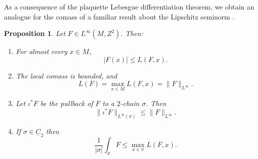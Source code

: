 \documentclass[reqno,11pt]{amsart}
\newcommand*\dif{\mathop{}\!\mathrm{d}}
\newcommand{\Chain}{\underline C}
\newtheorem{proposition}[theorem]{Proposition}
\theoremstyle{definition}
\numberwithin{equation}{section}
\begin{document}
As a consequence of the plaquette Lebesgue differentiation theorem, we obtain an analogue for the comass of a familiar result about the Lipschitz seminorm \cite[Lemma 4.3]{Crandall2008}.

\begin{proposition}\label{crandall}
Let $F \in L^\infty(M, Z^2)$. Then:
\begin{enumerate}
\item For almost every $x \in M$,
$$|F(x)| \leq L(F, x).$$
\label{crandall LDT}
\item The local comass is bounded, and \label{crandall linfinity}
$$L(F) = \max_{x \in M} L(F, x) = \|F\|_{L^\infty}.$$
\item Let $\iota^* F$ be the pullback of $F$ to a $2$-chain $\sigma$. Then
$$\|\iota^* F\|_{L^\infty(\sigma)} \leq \|F\|_{L^\infty}.$$
\label{crandall normal trace is contraction}
\item If $\sigma \in \Chain_2$ then \label{crandall best curl is ABC}
$$\frac{1}{|\sigma|} \int_\sigma F \leq \max_{x \in \sigma} L(F, x).$$
\end{enumerate}
\end{proposition}
\end{document}
